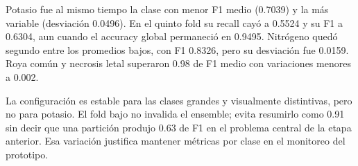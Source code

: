 Potasio fue al mismo tiempo la clase con menor F1 medio (0.7039) y la más
variable (desviación 0.0496). En el quinto fold su recall cayó a 0.5524 y su F1
a 0.6304, aun cuando el accuracy global permaneció en 0.9495. Nitrógeno quedó
segundo entre los promedios bajos, con F1 0.8326, pero su desviación fue 0.0159.
Roya común y necrosis letal superaron 0.98 de F1 medio con variaciones menores
a 0.002.

La configuración es estable para las clases grandes y visualmente distintivas,
pero no para potasio. El fold bajo no invalida el ensemble; evita resumirlo como
0.91 sin decir que una partición produjo 0.63 de F1 en el problema central de
la etapa anterior. Esa variación justifica mantener métricas por clase en el
monitoreo del prototipo.
